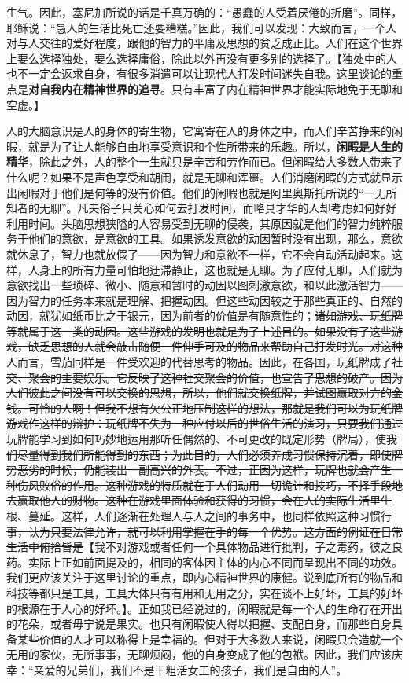\documentclass[12pt,oneside]{book}
\begin{document}
生气。因此，塞尼加所说的话是千真万确的：“愚蠢的人受着厌倦的折磨”。同样，耶稣说：“愚人的生活比死亡还要糟糕。”因此，我们可以发现：大致而言，一个人对与人交往的爱好程度，跟他的智力的平庸及思想的贫乏成正比。人们在这个世界上要么选择独处，要么选择庸俗，除此以外再没有更多别的选择了。【独处中的人也不一定会返求自身，有很多消遣可以让现代人打发时间迷失自我。这里谈论的重点是\textbf{对自我内在精神世界的追寻}。只有丰富了内在精神世界才能实际地免于无聊和空虚。】

人的大脑意识是人的身体的寄生物，它寓寄在人的身体之中，而人们辛苦挣来的闲暇，就是为了让人能够自由地享受意识和个性所带来的乐趣。所以，\textbf{闲暇是人生的精华}，除此之外，人的整个一生就只是辛苦和劳作而已。但闲暇给大多数人带来了什么呢？如果不是声色享受和胡闹，就是无聊和浑噩。人们消磨闲暇的方式就显示出闲暇对于他们是何等的没有价值。他们的闲暇也就是阿里奥斯托所说的“一无所知者的无聊”。凡夫俗子只关心如何去打发时间，而略具才华的人却考虑如何好好利用时间。头脑思想狭隘的人容易受到无聊的侵袭，其原因就是他们的智力纯粹服务于他们的意欲，是意欲的工具。如果诱发意欲的动因暂时没有出现，那么，意欲就休息了，智力也就放假了——因为智力和意欲不一样，它不会自动活动起来。这样，人身上的所有力量可怕地迂滞静止，这也就是无聊。为了应付无聊，人们就为意欲找出一些琐碎、微小、随意和暂时的动因以图刺激意欲，和以此激活智力——因为智力的任务本来就是理解、把握动因。但这些动因较之于那些真正的、自然的动因，就犹如纸币比之于银元，因为前者的价值是有随意性的；\sout{诸如游戏、玩纸牌等就属于这一类的动因。这些游戏的发明也就是为了上述目的。如果没有了这些游戏，缺乏思想的人就会敲击随便一件伸手可及的物品来帮助自己打发时光。对这种人而言，雪茄同样是一件受欢迎的代替思考的物品。因此，在各国，玩纸牌成了社交、聚会的主要娱乐。它反映了这种社交聚会的价值，也宣告了思想的破产。因为人们彼此之间没有可以交换的思想，所以，他们就交换纸牌，并试图赢取对方的金钱。可怜的人啊！但我不想有欠公正地压制这样的想法，那就是我们可以为玩纸牌游戏作这样的辩护：玩纸牌不失为一种应付以后的世俗生活的演习，只要我们通过玩牌能学习到如何巧妙地运用那听任偶然的、不可更改的既定形势（牌局），使我们尽量得到我们所能得到的东西；为此目的，人们必须养成习惯保持沉着，即使牌势恶劣的时候，仍能装出一副高兴的外表。不过，正因为这样，玩牌也就会产生一种伤风败俗的作用。这种游戏的特质就在于人们动用一切诡计和技巧，不择手段地去赢取他人的财物。这种在游戏里面体验和获得的习惯，会在人的实际生活里生根、蔓延。这样，人们逐渐在处理人与人之间的事务中，也同样依照这种习惯行事，认为只要法律允许，就可以利用掌握在手的每一个优势。这方面的例证在日常生活中俯拾皆是}【我不对游戏或者任何一个具体物品进行批判，子之毒药，彼之良药。实际上正如前面提及的，相同的客体因主体的内心不同而呈现出不同的功效。我们更应该关注于这里讨论的重点，即内心精神世界的康健。说到底所有的物品和科技等都只是工具，工具大体只有有用和无用之分，实在谈不上好坏，工具的好坏的根源在于人心的好坏。】。正如我已经说过的，闲暇就是每一个人的生命存在开出的花朵，或者毋宁说是果实。也只有闲暇使人得以把握、支配自身，而那些自身具备某些价值的人才可以称得上是幸福的。但对于大多数人来说，闲暇只会造就一个无用的家伙，无所事事，无聊烦闷，他的自身变成了他的包袱。因此，我们应该庆幸：“亲爱的兄弟们，我们不是干粗活女工的孩子，我们是自由的人”。 
\end{document}
